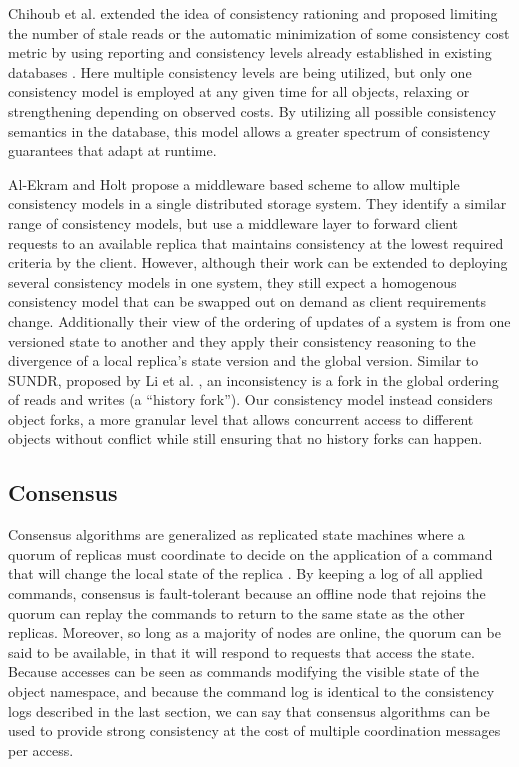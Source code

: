 \documentclass{article}
\begin{document}
Chihoub et al. extended the idea of consistency rationing and proposed limiting the number of stale reads or the automatic minimization of some consistency cost metric by using reporting and consistency levels already established in existing databases \cite{chihoub_harmony:_2012,chihoub_consistency_2013}. Here multiple consistency levels are being utilized, but only one consistency model is employed at any given time for all objects, relaxing or strengthening depending on observed costs. By utilizing all possible consistency semantics in the database, this model allows a greater spectrum of consistency guarantees that adapt at runtime.

Al-Ekram and Holt \cite{al-ekram_multi-consistency_2010} propose a middleware based scheme to allow multiple consistency models in a single distributed storage system. They identify a similar range of consistency models, but use a middleware layer to forward client requests to an available replica that maintains consistency at the lowest required criteria by the client. However, although their work can be extended to deploying several consistency models in one system, they still expect a homogenous consistency model that can be swapped out on demand as client requirements change. Additionally their view of the ordering of updates of a system is from one versioned state to another and they apply their consistency reasoning to the divergence of a local replica's state version and the global version. Similar to SUNDR, proposed by Li et al. \cite{li_secure_2004}, an inconsistency is a fork in the global ordering of reads and writes (a ``history fork''). Our consistency model instead considers object forks, a more granular level that allows concurrent access to different objects without conflict while still ensuring that no history forks can happen.

\subsection{Consensus}

Consensus algorithms are generalized as replicated state machines where a quorum of replicas must coordinate to decide on the application of a command that will change the local state of the replica \cite{schneider_implementing_1990}. By keeping a log of all applied commands, consensus is fault-tolerant because an offline node that rejoins the quorum can replay the commands to return to the same state as the other replicas.   Moreover, so long as a majority of nodes are online, the quorum can be said to be available, in that it will respond to requests that access the state. Because accesses can be seen as commands modifying the visible state of the object namespace, and because the command log is identical to the consistency logs described in the last section, we can say that consensus algorithms can be used to provide strong consistency at the cost of multiple coordination messages per access.
\end{document}

